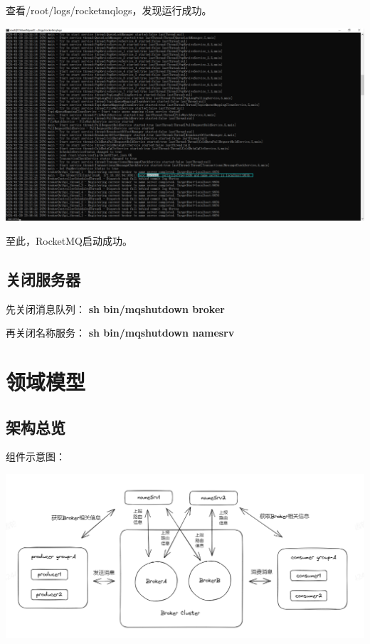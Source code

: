 \documentclass[11pt, a4paper, oneside, fontset=none]{ctexbook}
\begin{document}
查看/root/logs/rocketmqlogs，发现运行成功。
\begin{center}
  \begin{minipage}{\textwidth}
    \center
    \includegraphics[width=\textwidth]{picture/broker启动成功.png}
    \captionsetup{hypcap=false}
    \label{fig:broker启动成功}
  \end{minipage}
\end{center}

至此，RocketMQ启动成功。

\section{关闭服务器}
先关闭消息队列：
{\bfseries\kaishu sh bin/mqshutdown broker}

再关闭名称服务：
{\bfseries\kaishu sh bin/mqshutdown namesrv}

\chapter{领域模型}
\section{架构总览}
组件示意图：
\begin{center}
  \begin{minipage}{\textwidth}
    \center
    \includegraphics[width=\textwidth]{picture/RocketMQ全局图.jpg}
    \captionsetup{hypcap=false}
    \label{fig:RocketMQ全局图}
  \end{minipage}
\end{center}
\end{document}
